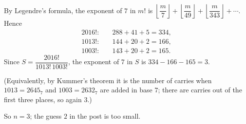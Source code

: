 By Legendre's formula, the exponent of $7$ in $m!$ is $\left\lfloor\dfrac {m}{7}\right\rfloor+\left\lfloor\dfrac {m}{49}\right\rfloor+\left\lfloor\dfrac {m}{343}\right\rfloor+\cdots$. Hence
\begin{align*}
2016!:&\quad 288+41+5=334,\\
1013!:&\quad 144+20+2=166,\\
1003!:&\quad 143+20+2=165.
\end{align*}
Since $S=\dfrac{2016!}{1013!\,1003!}$, the exponent of $7$ in $S$ is $334-166-165=3$.

(Equivalently, by Kummer's theorem it is the number of carries when $1013=2645_7$ and $1003=2632_7$ are added in base $7$; there are carries out of the first three places, so again $3$.)

So $n=\boxed{3}$; the guess $2$ in the post is too small.
